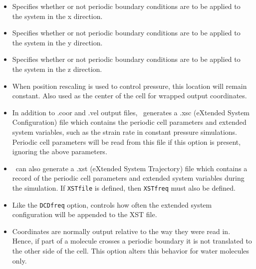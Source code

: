 \begin{itemize}

\item
{}
{Specifies whether or not periodic boundary conditions 
are to be applied to the system in the x direction.}

\item
{}
{Specifies whether or not periodic boundary conditions 
are to be applied to the system in the y direction.}

\item
{}
{Specifies whether or not periodic boundary conditions 
are to be applied to the system in the z direction.}

\item
{}
{When position rescaling is used to control pressure, this location will remain constant.  Also used as the center of the cell for wrapped output coordinates.}

\item
{}
{In addition to .coor and .vel output files, \NAMD\ generates a .xsc (eXtended System Configuration) file which contains the periodic cell parameters and extended system variables, such as the strain rate in constant pressure simulations.  Periodic cell parameters will be read from this file if this option is present, ignoring the above parameters.}

\item
{}
{\NAMD\ can also generate a .xst (eXtended System Trajectory) file which contains a record of the periodic cell parameters and extended system variables during the simulation.  If {\tt XSTfile} is defined, then {\tt XSTfreq} must also be defined.}

\item
{}
{Like the {\tt DCDfreq} option, controls how often the extended system configuration will be appended to the XST file.}

\item
{}
{Coordinates are normally output relative to the way they were read in.  Hence, if part of a molecule crosses a periodic boundary it is not translated to the other side of the cell.  This option alters this behavior for water molecules only.}

\end{itemize}

